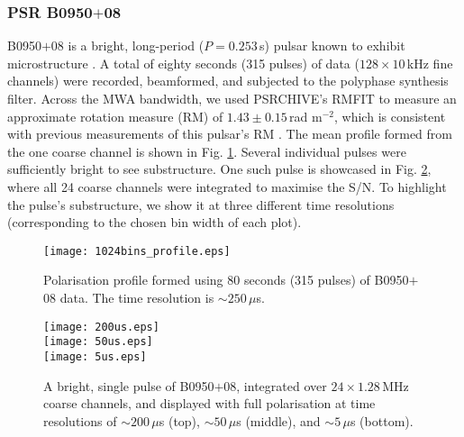 \documentclass{pasa}%
\newcommand{\psrslowB}{B0950$+$08}
\begin{document}

\subsubsection{PSR \psrslowB{}}

\psrslowB{} is a bright, long-period ($P = 0.253\,$s) pulsar known to exhibit microstructure \citep{Popov2002,Kuzmin2003}.
A total of eighty seconds (315 pulses) of data ($128 \times 10\,$kHz fine channels) were recorded, beamformed, and subjected to the polyphase synthesis filter.
Across the MWA bandwidth, we used PSRCHIVE's RMFIT to measure an approximate rotation measure (RM) of $1.43 \pm 0.15\,$rad m$^{-2}$, which is consistent with previous measurements of this pulsar's RM \citep[e.g.][]{Noutsos2015}.
The mean profile formed from the one coarse channel is shown in Fig. \ref{fig:0950_80_secs}.
Several individual pulses were sufficiently bright to see substructure.
One such pulse is showcased in Fig. \ref{fig:0950_single_pulse}, where all 24 coarse channels were integrated to maximise the S/N.
To highlight the pulse's substructure, we show it at three different time resolutions (corresponding to the chosen bin width of each plot).

\begin{figure}[t!]
    \centering
    \texttt{[image: 1024bins\_profile.eps]}
    \caption{Polarisation profile formed using 80 seconds (315 pulses) of \psrslowB{} data. The time resolution is $\sim 250\,\mu$s.}
    \label{fig:0950_80_secs}
\end{figure}

\begin{figure}[t!]
    \centering
    \texttt{[image: 200us.eps]} \\[10pt]
    \texttt{[image: 50us.eps]} \\[10pt]
    \texttt{[image: 5us.eps]}
    \caption{A bright, single pulse of \psrslowB{}, integrated over $24 \times 1.28\,$MHz coarse channels, and displayed with full polarisation at time resolutions of $\sim 200\,\mu$s (top), $\sim 50\,\mu$s (middle), and $\sim 5\,\mu$s (bottom).}
    \label{fig:0950_single_pulse}
\end{figure}
\end{document}
